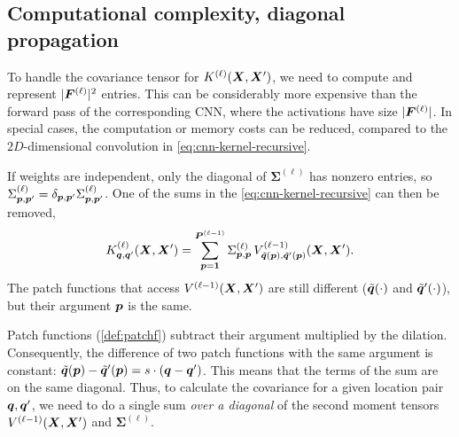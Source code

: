 \documentclass[accepted]{uai2021} %
\newcommand{\layersizebase}{\vF}
\newcommand{\layersize}[1]{{\layersizebase^{\bra{#1}}}}
\newcommand{\patchsizebase}{\vP}
\newcommand{\patchsize}[1]{{\patchsizebase^{\bra{#1}}}}
\newcommand{\patchf}[2]{{\tilde#1\bra{#2}}}
\newcommand{\priorWcovs}[1]{\Sigma^{(#1)}}
\newcommand{\priorWcov}[1]{\boldsymbol{\Sigma}^{(#1)}}
\newcommand{\patch}{\vp}               %
\newcommand{\nextpatch}{\vq}
\newcommand{\covf}[1]{K\ssup{#1}}
\newcommand{\nlinf}[1]{V\ssup{#1}}
\newcommand{\0}{\boldsymbol{0}}
\newcommand{\1}{\boldsymbol{1}}
\newcommand{\crefp}[1]{(\cref{#1})}
\begin{document}

\subsection{Computational complexity, diagonal propagation}
To handle the covariance tensor for $\covf{\ell}\bra{\mX,\mX'}$, we need to compute and represent $\absshort{\layersize{\ell}}^{2}$ entries. This can be considerably more expensive than the forward pass of the corresponding CNN, where the activations have size $\absshort{\layersize{\ell}}$.
In special cases, the computation or memory costs can be reduced, compared to the $2D$-dimensional convolution in \cref{eq:cnn-kernel-recursive}.

If weights are independent, only the diagonal of $\priorWcov{\ell}$ has nonzero entries, so $\priorWcovs{\ell}_{\patch,\patch'} = \delta_{\patch,\patch'}\priorWcovs{\ell}_{\patch,\patch'}$. One of the sums in the \cref{eq:cnn-kernel-recursive} can then be removed,
\begin{equation}
\covf{\ell}_{\nextpatch,\nextpatch'}\bra{\mX, \mX'} =
\sum_{\patch=\1}^{\patchsize{\ell-1}}
\priorWcovs{\ell}_{\patch,\patch} \,
\nlinf{\ell-1}_{\patchf{\nextpatch}{\patch},\patchf{\nextpatch'}{\patch}}\bra{\mX, \mX'}.
\label{eq:cnn-kernel-independent-weights}
\end{equation}
The patch functions that access $\nlinf{\ell-1}\bra{\mX,\mX'}$ are still
different ($\patchf{\nextpatch}{\cdot}$ and $\patchf{\nextpatch'}{\cdot}$), but
their argument $\patch$ is the same.

Patch functions \crefp{def:patchf} subtract their argument multiplied by the dilation. Consequently, the difference  of two patch functions with the same argument is constant: $\patchf{\nextpatch}{\patch} - \patchf{\nextpatch'}{\patch} = s\cdot\bra{\nextpatch - \nextpatch'}$. This means that the terms of the sum are on the same diagonal. Thus, to calculate the covariance for a given location pair $\nextpatch,\nextpatch'$, we need to do a single sum \emph{over a diagonal} of the second moment tensors $\nlinf{\ell-1}\bra{\mX, \mX'}$ and $\priorWcov{\ell}.$
\end{document}

